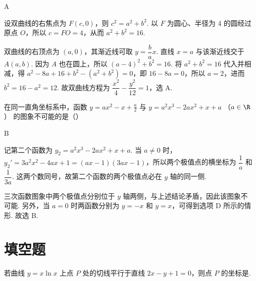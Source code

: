 \begin{answer}
A
\end{answer}

\begin{solution}
设双曲线的右焦点为 \(F(c,0)\)，则 \(c^2=a^2+b^2\). 以 \(F\) 为圆心、半径为 4 的圆经过原点 \(O\)，所以 \(c=FO=4\)，从而 \(a^2+b^2=16\).

双曲线的右顶点为 \((a,0)\)，其渐近线可取 \(y=\dfrac ba x\). 直线 \(x=a\) 与该渐近线交于 \(A(a,b)\). 因为 \(A\) 也在圆上，所以
\((a-4)^2+b^2=16\).
将 \(a^2+b^2=16\) 代入并相减，得 \(a^2-8a+16+b^2-(a^2+b^2)=0\)，即 \(16-8a=0\)，所以 \(a=2\)，进而 \(b^2=16-a^2=12\). 故双曲线方程为 \(\dfrac{x^2}{4}-\dfrac{y^2}{12}=1\)，选 A.
\end{solution}

\begin{problem}
在同一直角坐标系中，函数 \( y = ax^{2} - x + \frac{a}{2} \) 与 \( y = a^{2}x^{3} - 2ax^{2} + x + a \) （\( a \in \R \)） 的图象不可能的是（\quad）

    {}
    {}
    {}
\end{problem}

\begin{answer}
B
\end{answer}

\begin{solution}
记第二个函数为 \(y_2=a^2x^3-2ax^2+x+a\). 当 \(a\ne0\) 时，
\(y_2'=3a^2x^2-4ax+1=(ax-1)(3ax-1)\)，所以两个极值点的横坐标为 \(\dfrac1a\) 和 \(\dfrac1{3a}\). 这两个数同号，故第二个函数的两个极值点必在 \(y\) 轴的同一侧.

三次函数图象中两个极值点分别位于 \(y\) 轴两侧，与上述结论矛盾，因此该图象不可能. 另外，当 \(a=0\) 时两函数分别为 \(y=-x\) 和 \(y=x\)，可得到选项 D 所示的情形. 故选 B.
\end{solution}

\section{填空题}

\begin{problem}
若曲线 \( y = x \ln x \) 上点 \(P\) 处的切线平行于直线 \( 2x - y + 1 = 0 \)，则点 \(P\) 的坐标是\fillinblank{}.
\end{problem}

